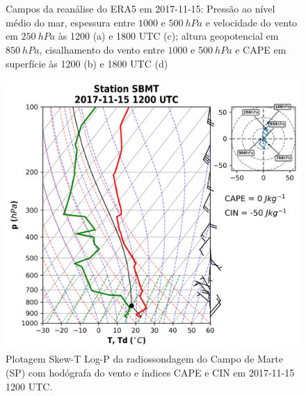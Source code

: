 \begin{figure}[htb]
	\begin{center}
		\caption{Campos da reanálise do ERA5 em 2017-11-15: Pressão ao nível médio do mar, espessura entre $1000$ e $500\:hPa$ e velocidade do vento em $250\:hPa$ às 1200 (a) e 1800 UTC (c); altura geopotencial em $850\:hPa$, cisalhamento do vento entre $1000$ e $500\:hPa$ e CAPE em superfície às 1200 (b) e 1800 UTC (d)} 
		\label{era5_20171115_main}
		 \\
		 \\
	\end{center}
\end{figure}

\begin{figure}[htb]
	\begin{center}
		\caption{Plotagem Skew-T Log-P da radiossondagem do Campo de Marte (SP) com hodógrafa do vento e índices CAPE e CIN em 2017-11-15 1200 UTC.} 
		\label{sondagem_20171115}
		\includegraphics[width=0.9\columnwidth]{../Sounding_Processing/figures/sounding_SBMT2017111512UTC.png}
	\end{center}
\end{figure}

